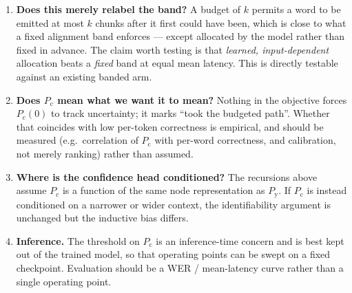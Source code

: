 \documentclass[11pt]{article}
\newcommand{\Py}{P_{\mathrm{y}}}
\newcommand{\Pc}{P_{\mathrm{c}}}
\begin{document}
\begin{enumerate}
  \item \textbf{Does this merely relabel the band?} A budget of $k$ permits a word
        to be emitted at most $k$ chunks after it first could have been, which is
        close to what a fixed alignment band enforces --- except allocated by the
        model rather than fixed in advance. The claim worth testing is that
        \emph{learned, input-dependent} allocation beats a \emph{fixed} band at
        equal mean latency. This is directly testable against an existing banded
        arm.

  \item \textbf{Does $\Pc$ mean what we want it to mean?} Nothing in the objective
        forces $\Pc(0)$ to track uncertainty; it marks ``took the budgeted path''.
        Whether that coincides with low per-token correctness is empirical, and
        should be measured (e.g.\ correlation of $\Pc$ with per-word correctness,
        and calibration, not merely ranking) rather than assumed.

  \item \textbf{Where is the confidence head conditioned?} The recursions above
        assume $\Pc$ is a function of the same node representation as $\Py$. If
        $\Pc$ is instead conditioned on a narrower or wider context, the
        identifiability argument is unchanged but the inductive bias differs.

  \item \textbf{Inference.} The threshold on $\Pc$ is an inference-time concern and
        is best kept out of the trained model, so that operating points can be
        swept on a fixed checkpoint. Evaluation should be a WER / mean-latency
        curve rather than a single operating point.
\end{enumerate}
\end{document}
